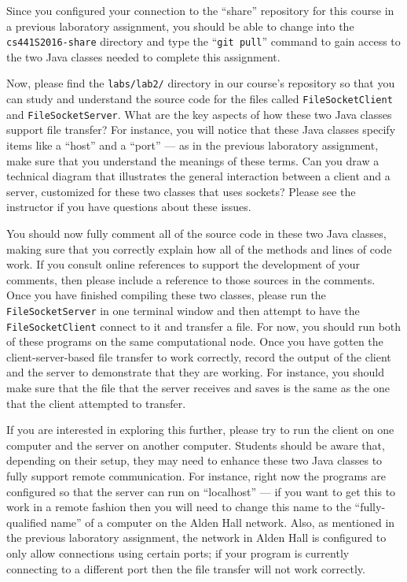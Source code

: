 Since you configured your connection to the ``share'' repository for this course in a previous laboratory assignment,
you should be able to change into the {\tt cs441S2016-share} directory and type the ``{\tt git pull}'' command to gain
access to the two Java classes needed to complete this assignment.

Now, please find the {\tt labs/lab2/} directory in our course's repository so that you can study and understand the
source code for the files called {\tt FileSocketClient} and {\tt FileSocketServer}. What are the key aspects of how
these two Java classes support file transfer? For instance, you will notice that these Java classes specify items like a
``host'' and a ``port'' --- as in the previous laboratory assignment, make sure that you understand the meanings of
these terms. Can you draw a technical diagram that illustrates the general interaction between a client and a server,
customized for these two classes that uses sockets? Please see the instructor if you have questions about these issues.

You should now fully comment all of the source code in these two Java classes, making sure that you correctly explain
how all of the methods and lines of code work. If you consult online references to support the development of your
comments, then please include a reference to those sources in the comments. Once you have finished compiling these two
classes, please run the {\tt FileSocketServer} in one terminal window and then attempt to have the {\tt
FileSocketClient} connect to it and transfer a file. For now, you should run both of these programs on the same
computational node. Once you have gotten the client-server-based file transfer to work correctly, record the output of the
client and the server to demonstrate that they are working. For instance, you should make sure that the file that the
server receives and saves is the same as the one that the client attempted to transfer.

If you are interested in exploring this further, please try to run the client on one computer and the server on another
computer. Students should be aware that, depending on their setup, they may need to enhance these two Java classes to
fully support remote communication. For instance, right now the programs are configured so that the server can run on
``localhost'' --- if you want to get this to work in a remote fashion then you will need to change this name to the
``fully-qualified name'' of a computer on the Alden Hall network. Also, as mentioned in the previous laboratory
assignment, the network in Alden Hall is configured to only allow connections using certain ports; if your program is
currently connecting to a different port then the file transfer will not work correctly.

